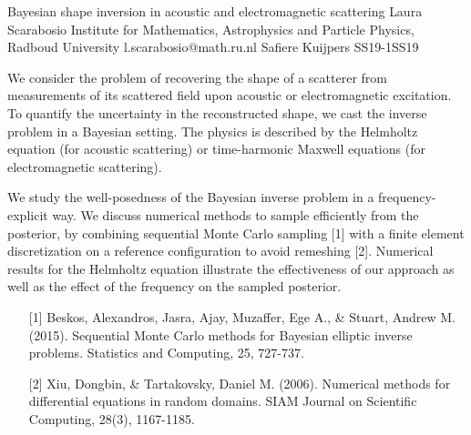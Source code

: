 \begin{talk}
  {Bayesian shape inversion in acoustic and electromagnetic scattering}%
  {Laura Scarabosio}%
  {Institute for Mathematics, Astrophysics and Particle Physics, Radboud University}%
  {l.scarabosio@math.ru.nl}%
  {Safiere Kuijpers}%
{}{}{SS19-1}{SS19}

			
We consider the problem of recovering the shape of a scatterer from measurements of its scattered field upon acoustic or electromagnetic excitation. To quantify the uncertainty in the reconstructed shape, we cast the inverse problem in a Bayesian setting. The physics is described by the Helmholtz equation (for acoustic scattering) or time-harmonic Maxwell equations (for electromagnetic scattering).

\smallskip
We study the well-posedness of the Bayesian inverse problem in a frequency-explicit way. We discuss numerical methods to sample efficiently from the posterior, by combining sequential Monte Carlo sampling [1] with a finite element discretization on a reference configuration to avoid remeshing [2]. Numerical results for the Helmholtz equation illustrate the effectiveness of our approach as well as the effect of the frequency on the sampled posterior.

\begin{enumerate}
	\item[{[1]}] Beskos, Alexandros, Jasra, Ajay, Muzaffer, Ege A., \& Stuart, Andrew M. (2015). Sequential Monte Carlo methods for Bayesian elliptic inverse problems. Statistics and Computing, 25, 727-737.
	
	\item[{[2]}] Xiu, Dongbin, \& Tartakovsky, Daniel M. (2006). Numerical methods for differential equations in random domains. SIAM Journal on Scientific Computing, 28(3), 1167-1185.
\end{enumerate}

\end{talk}

